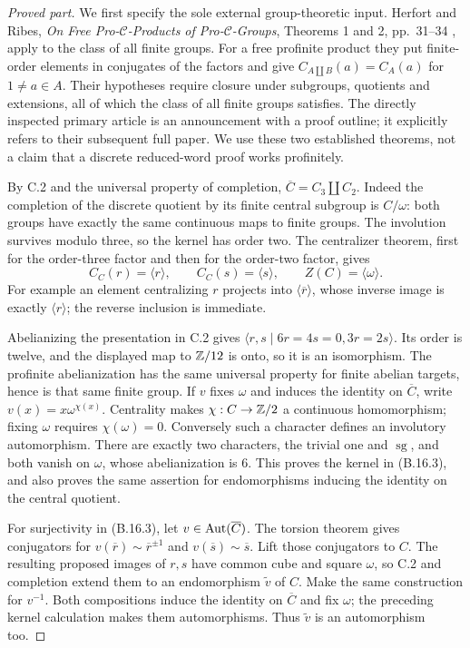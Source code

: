 \begin{proof}[Proved part]
We first specify the sole external group-theoretic input.
Herfort and Ribes, \emph{On Free Pro-$\mathcal C$-Products of
Pro-$\mathcal C$-Groups}, Theorems 1 and 2, pp.~31--34
\cite{HerfortRibes1984}, apply to the class of all finite groups.
For a free profinite product they put finite-order elements in
conjugates of the factors and give $C_{A\amalg B}(a)=C_A(a)$ for
$1\ne a\in A$. Their hypotheses require closure under subgroups,
quotients and extensions, all of which the class of all finite
groups satisfies. The directly inspected primary article is an
announcement with a proof outline; it explicitly refers to their
subsequent full paper. We use these two established theorems,
not a claim that a discrete reduced-word proof works profinitely.

By C.2 and the universal property of completion,
$\overline C=C_3\amalg C_2$. Indeed the completion of the discrete
quotient by its finite central subgroup is $C/\omega$: both groups
have exactly the same continuous maps to finite groups. The
involution survives modulo three, so the kernel has order two.
The centralizer theorem, first for the order-three factor and then
for the order-two factor, gives
\[
 C_C(r)=\langle r\rangle,\qquad
 C_C(s)=\langle s\rangle,\qquad Z(C)=\langle\omega\rangle.
 \tag{B.16.14}
\]
For example an element centralizing $r$ projects into
$\langle\overline r\rangle$, whose inverse image is exactly
$\langle r\rangle$; the reverse inclusion is immediate.

Abelianizing the presentation in C.2 gives
$\langle r,s\mid6r=4s=0, 3r=2s\rangle$.
Its order is twelve, and the displayed map to $\mathbb Z/12$ is onto,
so it is an isomorphism. The profinite abelianization has the same
universal property for finite abelian targets, hence is that same
finite group. If $v$ fixes $\omega$ and induces the identity on
$\overline C$, write $v(x)=x\omega^{\chi(x)}$. Centrality makes
$\chi:C\to\mathbb Z/2$ a continuous homomorphism; fixing $\omega$
requires $\chi(\omega)=0$. Conversely such a character defines
an involutory automorphism. There are exactly two characters,
the trivial one and $\operatorname{sg}$, and both vanish on
$\omega$, whose abelianization is $6$. This proves the kernel
in (B.16.3), and also proves the same assertion for endomorphisms
inducing the identity on the central quotient.

For surjectivity in (B.16.3), let $v\in\operatorname{Aut}(\overline C)$.
The torsion theorem gives conjugators for
$v(\overline r)\sim\overline r^{\pm1}$ and
$v(\overline s)\sim\overline s$. Lift those conjugators to $C$.
The resulting proposed images of $r,s$ have common cube and square
$\omega$, so C.2 and completion extend them to an endomorphism
$\widetilde v$ of $C$. Make the same construction for $v^{-1}$.
Both compositions induce the identity on $\overline C$ and fix
$\omega$; the preceding kernel calculation makes them
automorphisms. Thus $\widetilde v$ is an automorphism too.


\end{proof}
